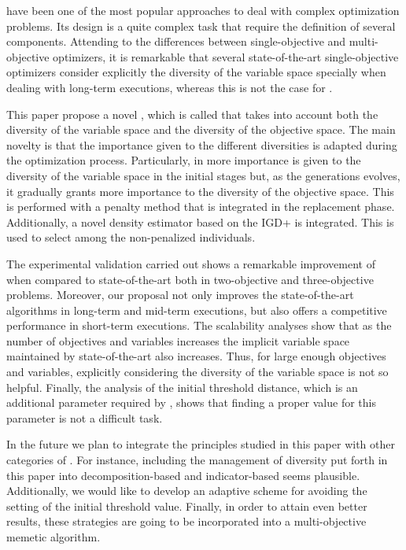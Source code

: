 \EAS{} have been one of the most popular approaches to deal with complex optimization problems.
%
Its design is a quite complex task that require the definition of several components.
%
Attending to the differences between single-objective and multi-objective optimizers, it is remarkable
that several state-of-the-art single-objective optimizers consider explicitly the diversity of the variable space specially
when dealing with long-term executions, whereas this is not the case for \MOEAS{}.
%
%
%

This paper propose a novel \MOEA{}, which is called \VSDMOEA{} that takes into account both the diversity of the variable space
and the diversity of the objective space.
%
The main novelty is that the importance given to the different diversities is adapted during the optimization process.
%
Particularly, in \VSDMOEA{} more importance is given to the diversity of the variable space in the initial stages
but, as the generations evolves, it gradually grants more importance to the diversity of the objective space.
%
This is performed with a penalty method that is integrated in the replacement phase.
%
Additionally, a novel density estimator based on the IGD+ is integrated.
%
This is used to select among the non-penalized individuals.

The experimental validation carried out shows a remarkable improvement of \VSDMOEA{} when compared to state-of-the-art \MOEAS{} both in
two-objective and three-objective problems.
%
Moreover, our proposal not only improves the state-of-the-art algorithms in long-term and mid-term executions,
but also offers a competitive performance in short-term executions.
%
The scalability analyses show that as the number of objectives and variables increases the implicit variable space maintained by state-of-the-art
\MOEAS{} also increases.
%
Thus, for large enough objectives and variables, explicitly considering the diversity of the variable space is not so helpful.
%
Finally, the analysis of the initial threshold distance, which is an additional parameter required by \VSDMOEA{}, shows that finding a proper
value for this parameter is not a difficult task.

In the future we plan to integrate the principles studied in this paper with other categories of \MOEAS{}.
%
For instance, including the management of diversity put forth in this paper into decomposition-based and indicator-based \MOEAS{} seems plausible.
%
Additionally, we would like to develop an adaptive scheme for avoiding the setting of the initial threshold value.
%
Finally, in order to attain even better results, these strategies are going to be incorporated into a multi-objective memetic algorithm.
%
